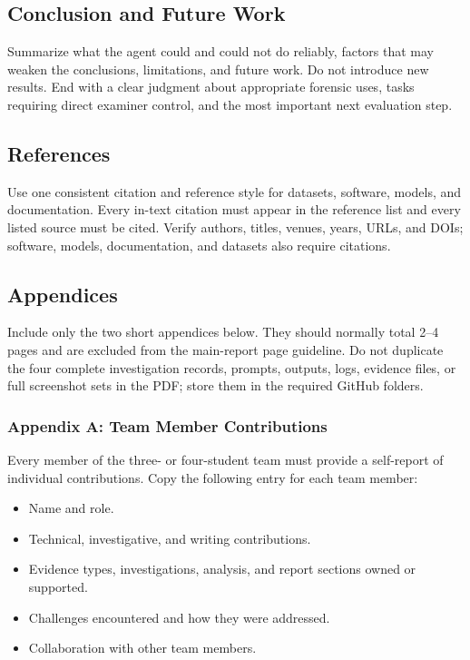 \documentclass[12pt,letterpaper]{article}
\begin{document}
\subsection{Conclusion and Future Work}
Summarize what the agent could and could not do reliably, factors that may weaken the conclusions, limitations, and future work.
Do not introduce new results. End with a clear judgment about appropriate forensic uses, tasks requiring direct examiner control, and the most important next evaluation step.

\subsection{References}
Use one consistent citation and reference style for datasets, software, models, and documentation.
Every in-text citation must appear in the reference list and every listed source must be cited. Verify authors, titles, venues, years, URLs, and DOIs; software, models, documentation, and datasets also require citations.


\subsection{Appendices}
Include only the two short appendices below. They should normally total 2--4 pages and are excluded from the main-report page guideline. Do not duplicate the four complete investigation records, prompts, outputs, logs, evidence files, or full screenshot sets in the PDF; store them in the required GitHub folders.

\subsubsection{Appendix A: Team Member Contributions}
Every member of the three- or four-student team must provide a self-report of individual contributions. Copy the following entry for each team member:
\begin{itemize}
    \item Name and role.
    \item Technical, investigative, and writing contributions.
    \item Evidence types, investigations, analysis, and report sections owned or supported.
    \item Challenges encountered and how they were addressed.
    \item Collaboration with other team members.
\end{itemize}
\end{document}

